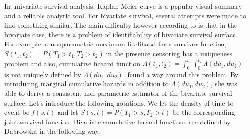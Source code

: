 \documentclass[]{article}
\begin{document}
In univariate survival analysis, Kaplan-Meier curve is a popular visual summary and a reliable analytic tool. For bivariate survival, several attempts were made to find something similar. The main difficulty however according to \cite{kalbfleisch2011statistical} is that in the bivariate case, there is a problem of identifiability of bivariate survival surface. For example, a nonparametric maximum likelihood for a survivor function, $S(t_1, t_2) = P(T_1>t_1, T_2>t_2)$ in the presence censoring has a uniqueness problem and also, cumulative hazard function $\Lambda(t_1, t_2) = \int_0^{t_1}\int_0^{t_2}\Lambda(du_1,du_2)$ is not uniquely defined by $\Lambda(du_1,du_2)$.  \cite{dabrowska1988kaplan} found a way around this problem. By introducing marginal cumulative hazards in addition to $\Lambda(du_1,du_2)$, she was able to derive a consistent non-parametric estimator of the bivariate survival surface. Let's introduce the following notations. We let the density of time to event be $f(s,t)$ and let $S(s,t) = P(T_1>s, T_2>t)$ be the corresponding joint survival function. Bivariate cumulative hazard functions are defined by Dabrowska in the following way:
\end{document}
